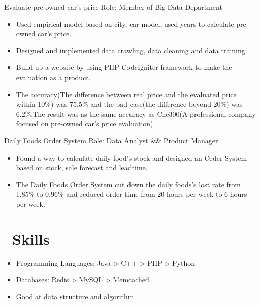 \documentclass{resume}
\begin{document}
Evaluate pre-owned car's price
\newline Role: Member of Big-Data Department
\begin{itemize}
  \item Used empirical model based on city, car model, used years to calculate pre-owned car's price.
  \item Designed and implemented data crawling, data cleaning and data training.
  \item Build up a website by using PHP CodeIgniter framework to make the evaluation as a product.
  \item The accuracy(The difference between real price and the evaluated price within 10\%) was 75.5\% and the bad case(the difference beyond 20\%) was 6.2\%.The result was as the same accuracy as Che300(A professional company focused on pre-owned car's price evaluation).
\end{itemize}

Daily Foods Order System
\newline Role: Data Analyst && Product Manager
\begin{itemize}
  \item Found a way to calculate daily food’s stock and designed an Order System based on stock, sale forecast and leadtime.
  \item The Daily Foods Order System cut down the daily foods's lost rate from 1.85\% to 0.96\% and reduced order time from 20 hours per week to 6 hours per week.
\end{itemize}

\section{\faCogs\ Skills}
\begin{itemize}[parsep=0.5ex]
  \item Programming Languages: Java > C++ > PHP > Python
  \item Databases: Redis > MySQL > Memcached
  \item Good at data structure and algorithm
\end{itemize}
\end{document}
